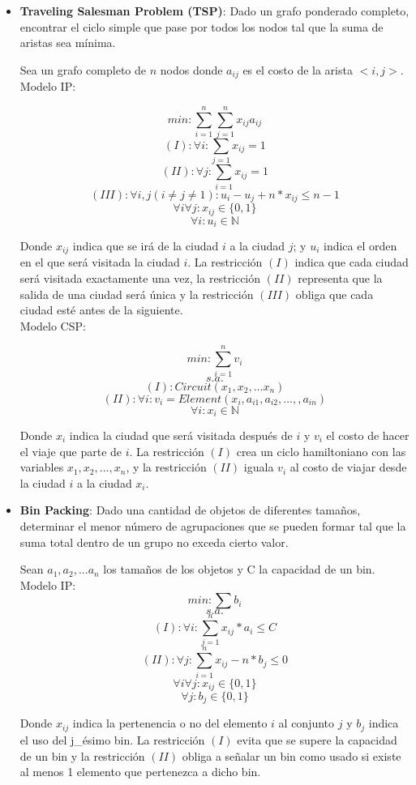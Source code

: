 \documentclass[12pt]{report}
\begin{document}
\begin{itemize}
\item \textbf{Traveling Salesman Problem (TSP)}: Dado un grafo ponderado completo, encontrar el ciclo simple que pase por todos los nodos tal que la suma de aristas sea mínima.

Sea un grafo completo de $n$ nodos donde $a_{ij}$ es el costo de la arista $<i,j>$.\\

Modelo IP:

$$min: \sum_{i=1}^n\sum_{j=1}^n x_{ij}a_{ij}$$
$$(I):\forall i: \sum_{j=1}x_{ij}=1$$
$$(II):\forall j: \sum_{i=1}x_{ij}=1$$
$$(III):\forall i,j (i\neq j\neq1):u_i-u_j+n*x_{ij}\leq n-1$$
$$\forall i\forall j: x_{ij}\in\{0,1\}$$
$$\forall i: u_i\in \mathbb{N}$$

Donde $x_{ij}$ indica que se irá de la ciudad $i$ a la ciudad $j$; y $u_i$ indica el orden en el que será visitada la ciudad $i$. La restricción $(I)$ indica que cada ciudad será visitada exactamente una vez, la restricción $(II)$ representa que la salida de una ciudad será única y la restricción $(III)$ obliga que cada ciudad esté antes de la siguiente.\\

Modelo CSP:

$$min:\sum_{i=1}^n v_i$$
$$s.a.$$
$$(I):Circuit(x_1,x_2,...x_n)$$
$$(II):\forall i:v_i=Element(x_i,a_{i1},a_{i2},...,,a_{in})$$
$$\forall i: x_i\in \mathbb{N}$$

Donde $x_i$ indica la ciudad que será visitada después de $i$ y $v_i$ el costo de hacer el viaje que parte de $i$. La restricción $(I)$ crea un ciclo hamiltoniano con las variables $x_1,x_2,...,x_n$, y la restricción $(II)$ iguala $v_i$ al costo de viajar desde la ciudad $i$ a la ciudad $x_i$.

\item \textbf{Bin Packing}: Dado una cantidad de objetos de diferentes tamaños, determinar el menor número de agrupaciones que se pueden formar tal que la suma total dentro de un grupo no exceda cierto valor.

Sean $a_1, a_2,...a_n$ los tamaños de los objetos y C la capacidad de un bin.\\

Modelo IP:
$$min:\sum b_i$$
$$s.a.$$
$$(I): \forall i: \sum_{j=1}^n x_{ij}*a_i\leq C$$
$$(II):\forall j:\sum_{i=1}^n x_{ij} -n*b_j\leq0$$
$$\forall i\forall j: x_{ij}\in\{0,1\}$$
$$\forall j: b_j\in \{0,1\}$$

Donde $x_{ij}$ indica la pertenencia o no del elemento $i$ al conjunto $j$ y $b_j$ indica el uso del j\_ésimo bin. La restricción $(I)$ evita que se supere la capacidad de un bin y la restricción $(II)$ obliga a señalar un bin como usado si existe al menos 1 elemento que pertenezca a dicho bin.\\


\end{itemize}
\end{document}
